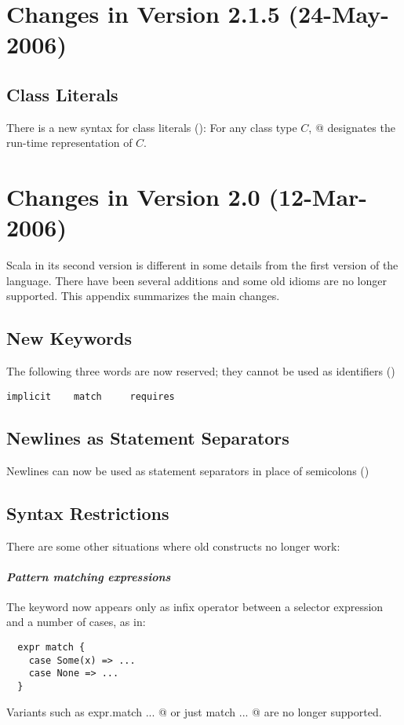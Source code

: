 \section{Changes in Version 2.1.5 (24-May-2006)}

\subsection*{Class Literals} There is a new syntax for class literals
(): For any class type $C$,
\lstinline@classOf[$C$]@ designates the run-time representation of
$C$.

\section{Changes in Version 2.0 (12-Mar-2006)}

Scala in its second version is different in some details from the
first version of the language. There have been several additions and
some old idioms are no longer supported. This appendix summarizes
the main changes.

\subsection*{New Keywords}

The following three words are now reserved; they cannot be used as
identifiers ()
\begin{lstlisting}
implicit    match     requires
\end{lstlisting}

\subsection*{Newlines as Statement Separators}

Newlines can now be used as statement separators in place of
semicolons ()

\subsection*{Syntax Restrictions}

There are some other situations where old constructs no longer work:

\paragraph{\em Pattern matching expressions} The \lstinline@match@
keyword now appears only as infix operator between a selector
expression and a number of cases, as in:
\begin{lstlisting}
  expr match {
    case Some(x) => ...
    case None => ...
  }
\end{lstlisting}
Variants such as \lstinline@ expr.match {...} @ 
or just
\lstinline@ match {...} @
are no longer supported.

